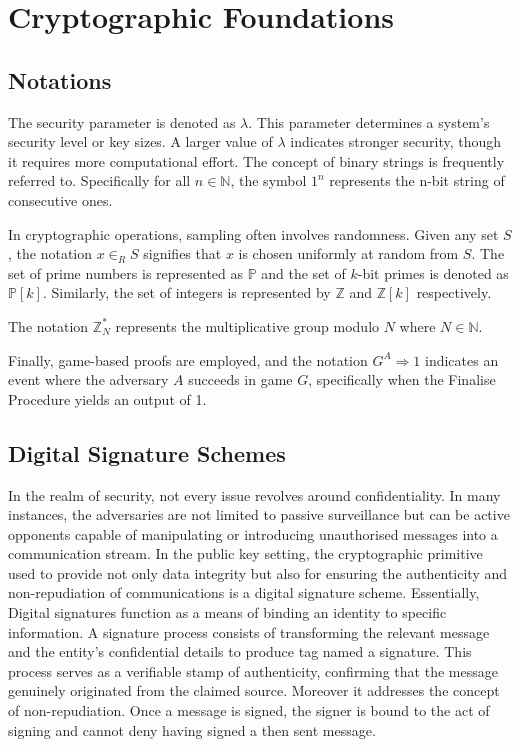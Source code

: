 \documentclass[]{final_report}
\theoremstyle{definition}
\begin{document}
\chapter{Cryptographic Foundations}
\section{Notations}
The security parameter is denoted as \( \lambda \). 
This parameter determines a system's security level or key sizes. A larger value of $\lambda$ indicates stronger security, though it requires more computational effort. The concept of binary strings is frequently referred to. Specifically for all \( n \in \mathbb{N} \), the symbol \( 1^n \) represents the n-bit string of consecutive ones. 

In cryptographic operations, sampling often involves randomness. Given any set \( S \), the notation \( x \in_{R} S \) signifies that \( x \) is chosen uniformly at random from \( S \).  
The set of prime numbers is represented as \( \mathbb{P} \) and the set of \( k \)-bit primes is denoted as \( \mathbb{P}[k] \). Similarly, the set of integers is represented by \( \mathbb{Z} \) and \( \mathbb{Z}[k] \) respectively. 

The notation \( \mathbb{Z}_N^* \) represents the multiplicative group modulo \( N \) where \( N \in \mathbb{N} \). 

Finally, game-based proofs are employed, and the notation \( G^A \Rightarrow 1 \) indicates an event where the adversary \( A \) succeeds in game \( G \), specifically when the Finalise Procedure yields an output of 1.


\section{Digital Signature Schemes}
In the realm of security, not every issue revolves around confidentiality. In many instances, the adversaries are not limited to passive surveillance but can be active opponents capable of manipulating or introducing unauthorised messages into a communication stream. In the public key setting, the cryptographic primitive used to provide not only data integrity but also for ensuring the authenticity and non-repudiation of communications is a digital signature scheme. 
Essentially, Digital signatures function as a means of binding an identity to specific information. A signature process consists of transforming the relevant message and the entity’s confidential details to produce tag named a signature. This process serves as a verifiable stamp of authenticity, confirming that the message genuinely originated from the claimed source. Moreover it addresses the concept of non-repudiation. Once a message is signed, the signer is bound to the act of signing and cannot deny having signed a then sent message.
\end{document}
